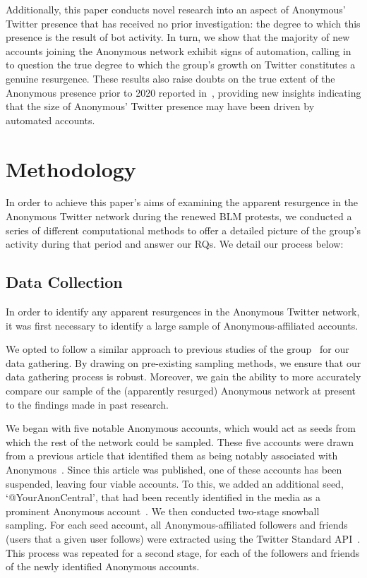 \documentclass[letterpaper]{article}
\begin{document}
Additionally, this paper conducts novel research into an aspect of Anonymous' Twitter presence that has received no prior investigation: the degree to which this presence is the result of bot activity. In turn, we show that the majority of new accounts joining the Anonymous network exhibit signs of automation, calling in to question the true degree to which the group's growth on Twitter constitutes a genuine resurgence. These results also raise doubts on the true extent of the Anonymous presence prior to 2020 reported in~\cite{Jones2020}, providing new insights indicating that the size of Anonymous' Twitter presence may have been driven by automated accounts.

\section{Methodology}
\label{Method}

In order to achieve this paper's aims of examining the apparent resurgence in the Anonymous Twitter network during the renewed BLM protests, we conducted a series of different computational methods to offer a detailed picture of the group's activity during that period and answer our RQs. We detail our process below:

\subsection{Data Collection}

In order to identify any apparent resurgences in the Anonymous Twitter network, it was first necessary to identify a large sample of Anonymous-affiliated accounts.

We opted to follow a similar approach to previous studies of the group~\cite{Jones2020} for our data gathering. By drawing on pre-existing sampling methods, we ensure that our data gathering process is robust. Moreover, we gain the ability to more accurately compare our sample of the (apparently resurged) Anonymous network at present to the findings made in past research.

We began with five notable Anonymous accounts, which would act as seeds from which the rest of the network could be sampled. These five accounts were drawn from a previous article that identified them as being notably associated with Anonymous~\cite{Jones2020}. Since this article was published, one of these accounts has been suspended, leaving four viable accounts. To this, we added an additional seed, `@YourAnonCentral', that had been recently identified in the media as a prominent Anonymous account~\cite{AJC2020}. 
We then conducted two-stage snowball sampling. For each seed account, all Anonymous-affiliated followers and friends (users that a given user follows)  were extracted using the Twitter Standard API~\cite{TwitterAPI}. This process was repeated for a second stage, for each of the followers and friends of the newly identified Anonymous accounts. 
\end{document}
